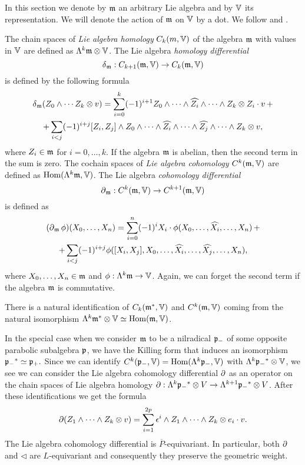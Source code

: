 In this section we denote by $\mathfrak{m}$ an arbitrary Lie algebra and by $\mathbb{V}$ its representation. We will denote the action of $\mathfrak{m}$ on $\mathbb{V}$ by a dot. We follow \cite{kostant_lie_1961} and \cite{cap_parabolic_2009}.

The chain spaces of \emph{Lie algebra homology} $C_k(m,\mathbb{V})$ of the algebra $\mathfrak{m}$ with values in $\mathbb{V}$ are defined as $\Lambda^k\mathfrak{m}\otimes\mathbb{V}$. The Lie algebra \emph{homology differential} \[\operatorname{\delta}_{\mathfrak{m}} : C_{k+1}(\mathfrak{m},\mathbb{V}) \to C_k(\mathfrak{m},\mathbb{V})\] is defined by the following formula
\begin{multline*}
\operatorname{\delta}_{\mathfrak{m}} (Z_0\wedge\cdots Z_k\otimes v) = \sum_{i=0}^k (-1)^{i+1} Z_0\wedge\cdots\wedge\widehat{Z_i}\wedge\cdots\wedge Z_k\otimes Z_i\cdot v\,  + \\
				      +\sum_{i<j} (-1)^{i+j} [Z_i,Z_j]\wedge Z_0\wedge\cdots\wedge\widehat{Z_i}\wedge\cdots\wedge\widehat{Z_j}\wedge\cdots\wedge Z_k\otimes v,
\end{multline*}
where $Z_i\in\mathfrak{m}$ for $i=0,\ldots,k$. If the algebra $\mathfrak{m}$ is abelian, then the second term in the sum is zero. The cochain spaces of \emph{Lie algebra cohomology} $C^k(\mathfrak{m},\mathbb{V})$ are defined as $\mathrm{Hom}(\Lambda^k \mathfrak{m},\mathbb{V})$. The Lie algebra \emph{cohomology differential} \[\operatorname{\partial}_{\mathfrak{m}} :  C^k(\mathfrak{m},\mathbb{V}) \to C^{k+1}(\mathfrak{m},\mathbb{V})\] is defined as
\begin{multline*}
 (\operatorname{\partial}_{\mathfrak{m}} \phi)(X_0,\ldots, X_n) = \sum_{i=0}^n (-1)^i X_i \cdot \phi(X_0,\ldots,\widehat{X_i},\ldots, X_n)\, + \\
				+\sum_{i<j} (-1)^{i+j} \phi([X_i,X_j],X_0,\ldots,\widehat{X_i},\ldots,\widehat{X_j},\ldots,X_n),
\end{multline*}
where $X_0,\ldots, X_n \in \mathfrak{m}$ and $\phi:\Lambda^k \mathfrak{m} \to \mathbb{V}$. Again, we can forget the second term if the algebra $\mathfrak{m}$ is commutative.

There is a natural identification of $C_k(\mathfrak{m}^*,\mathbb{V})$ and $C^k(\mathfrak{m},\mathbb{V})$ coming from the natural isomorphism $\Lambda^k \mathfrak{m}^* \otimes \mathbb{V} \simeq \mathrm{Hom}(\mathfrak{m},\mathbb{V})$.

In the special case when we consider $\mathfrak{m}$ to be a nilradical $\mathfrak{p}_-$ of some opposite parabolic subalgebra $\mathfrak{p}$, we have the Killing form that induces an isomorphism ${\mathfrak{p}_-}^* \simeq \mathfrak{p}_+.$ Since we can identify $C^k(\mathfrak{p}_-,\mathbb{V})=\mathrm{Hom} (\Lambda^k\mathfrak{p}_-,\mathbb{V})$ with $\Lambda^k {\mathfrak{p}_-}^*\otimes\mathbb{V}$, we see we can consider the Lie algebra cohomology differential $\operatorname{\partial}$ as an operator on the chain spaces of Lie algebra homology $\operatorname{\partial}: \Lambda^k {\mathfrak{p}_-}^* \otimes V \to \Lambda^{k+1}{\mathfrak{p}_-}^*\otimes V$. After these identifications we get the formula
\[
 \operatorname{\partial}  (Z_1\wedge\cdots\wedge Z_k\otimes v) = \sum_{i=1}^{2p} \epsilon^i \wedge Z_1\wedge\cdots\wedge Z_k\otimes e_i\cdot v.
\] The Lie algebra cohomology differential is $\overline{P}$-equivariant. In particular, both $\operatorname{\partial}$ and $\lhd$ are $L$-equivariant and consequently they preserve the geometric weight.

